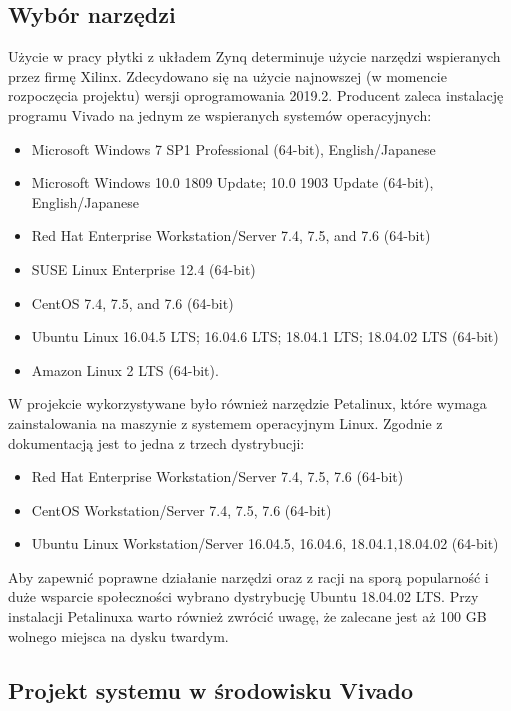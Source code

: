\subsection{Wybór narzędzi}

Użycie w pracy płytki z układem Zynq determinuje użycie narzędzi wspieranych 
przez firmę Xilinx. Zdecydowano się na użycie najnowszej (w momencie rozpoczęcia 
projektu) wersji oprogramowania 2019.2. Producent zaleca\cite{VivadoGuide} instalację 
programu Vivado na jednym ze wspieranych systemów operacyjnych:

\begin{itemize}
  \item Microsoft Windows 7 SP1 Professional (64-bit), English/Japanese 
  \item Microsoft Windows 10.0 1809 Update; 10.0 1903 Update (64-bit), English/Japanese
  \item Red Hat Enterprise Workstation/Server 7.4, 7.5, and 7.6 (64-bit)
  \item SUSE Linux Enterprise 12.4 (64-bit)
  \item CentOS 7.4, 7.5, and 7.6 (64-bit)
  \item Ubuntu Linux 16.04.5 LTS; 16.04.6 LTS; 18.04.1 LTS; 18.04.02 LTS (64-bit)
  \item Amazon Linux 2 LTS (64-bit).
\end{itemize}

\bigskip
W projekcie wykorzystywane było również narzędzie Petalinux, które wymaga 
zainstalowania na maszynie z systemem operacyjnym Linux. Zgodnie z 
dokumentacją\cite{PetalinuxGuide} jest to jedna z trzech dystrybucji:

\begin{itemize}
\item Red Hat Enterprise Workstation/Server 7.4, 7.5, 7.6 (64-bit)
\item CentOS Workstation/Server 7.4, 7.5, 7.6 (64-bit)
\item Ubuntu Linux Workstation/Server 16.04.5, 16.04.6, 18.04.1,18.04.02 (64-bit)
\end{itemize}

\bigskip
Aby zapewnić poprawne działanie narzędzi oraz z racji na sporą popularność i duże 
wsparcie społeczności wybrano dystrybucję Ubuntu 18.04.02 LTS. Przy instalacji 
Petalinuxa warto również zwrócić uwagę, że zalecane jest aż 100 GB wolnego miejsca 
na dysku twardym. 

\subsection{Projekt systemu w środowisku Vivado}

